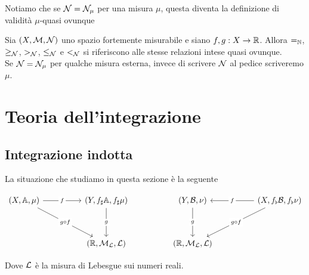 \documentclass[openany]{book}
\begin{document}
Notiamo che se $\mathcal{N} = \mathcal{N}_\mu$ per una misura $\mu$, questa diventa la definizione di validità $\mu$-quasi ovunque

\begin{notation}{}{}
    Sia $(X,\mathcal{M},\mathcal{N})$ uno spazio fortemente misurabile e siano $f, g : X \to \mathbb{R}$. Allora $=_{\mathbb{N}}$, $\ge_{\mathcal{N}}$, $>_{\mathcal{N}}$, $\le_{\mathcal{N}}$ e $<_{\mathcal{N}}$ si riferiscono alle stesse relazioni intese quasi ovunque.\\
    Se $\mathcal{N} = \mathcal{N}_\mu$ per qualche misura esterna, invece di scrivere $\mathcal{N}$ al pedice scriveremo $\mu$.
\end{notation}

\section{Teoria dell'integrazione}

\subsection{Integrazione indotta}

La situazione che studiamo in questa sezione è la seguente

\[\begin{tikzcd}
	{(X,\A,\mu)} && {(Y, f_\sharp\A, f_\sharp\mu)} && {(Y, \B, \nu)} && {(X, f_\flat\B, f_\flat\nu)} \\
	\\
	&& {(\R, \M_\L, \L)} && {(\R,\M_\L, \L)}
	\arrow["f"{description}, from=1-1, to=1-3]
	\arrow["{g \circ f}"{description}, from=1-1, to=3-3]
	\arrow["g"{description}, from=1-3, to=3-3]
	\arrow["g"{description}, from=1-5, to=3-5]
	\arrow["f"{description}, from=1-7, to=1-5]
	\arrow["{g \circ f}"{description}, from=1-7, to=3-5]
\end{tikzcd}\]

Dove $\mathcal{L}$ è la misura di Lebesgue sui numeri reali.
\end{document}
